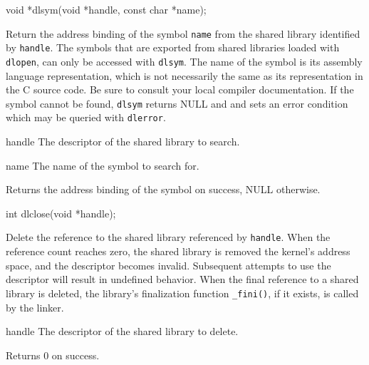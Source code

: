 \begin{apisyn}

	\funcproto void *dlsym(void *handle, const char *name);
\end{apisyn}
\begin{apidesc}
	Return the address binding of the symbol \texttt{name} from the
	shared library identified by \texttt{handle}. The symbols that are
	exported from shared libraries loaded with \texttt{dlopen}, can only
	be accessed with \texttt{dlsym}. The name of the symbol is its
	assembly language representation, which is not necessarily the same
	as its representation in the C source code. Be sure to consult your
	local compiler documentation. If the symbol cannot be found,
	\texttt{dlsym} returns NULL and and sets an error condition which
        may be queried with \texttt{dlerror}.
\end{apidesc}
\begin{apiparm}
	\item[handle]
		The descriptor of the shared library to search.
	\item[name]
		The name of the symbol to search for.
\end{apiparm}
\begin{apiret}
	Returns the address binding of the symbol on success, NULL
	otherwise. 
\end{apiret}


\begin{apisyn}

	\funcproto int dlclose(void *handle);
\end{apisyn}
\begin{apidesc}
	Delete the reference to the shared library referenced by
	\texttt{handle}. When the reference count reaches zero, the shared
	library is removed the \oskit{} kernel's address space, and the
	descriptor becomes invalid. Subsequent attempts to use the descriptor
	will result in undefined behavior. When the final reference
	to a shared library is deleted, the library's finalization
	function \texttt{_fini()}, if it exists, is called by the linker.
\end{apidesc}
\begin{apiparm}
	\item[handle]
		The descriptor of the shared library to delete.
\end{apiparm}
\begin{apiret}
	Returns 0 on success.
\end{apiret}


